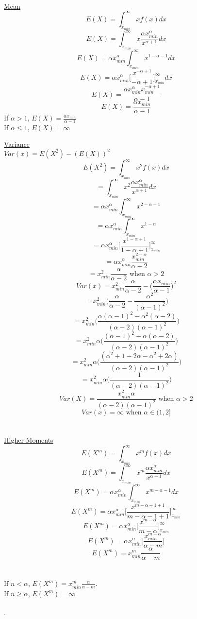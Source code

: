 \documentclass[14pt, a4paper]{article}
\theoremstyle{definition}
\begin{document}
\\ \underline{Mean}
\[ E(X) = \int^\infty _{x_{min}} x f(x) dx\]
\[ E(X) = \int^\infty _{x_{min}} x \frac{\alpha x_{min}^\alpha}{x^{\alpha+1}} dx\]
\[ E(X) = \alpha x_{min}^\alpha \int^\infty _{x_{min}} x^{1 - \alpha - 1} dx\]
\[ E(X) = \alpha x_{min}^\alpha \Big[ \frac{x^{- \alpha +1}}{-\alpha + 1} \Big]^\infty_{x_{min}} dx\]
\[ E(X) =  \frac{\alpha x_{min}^\alpha x_{min}^{-\alpha + 1}}{\alpha - 1} \]
\[ E(X) = \frac{\alpha x_{min}}{\alpha - 1} \]
If $\alpha > 1$, $E(X) = \frac{\alpha x_{min}}{\alpha - 1} $ 
\\ If $\alpha \leq 1$, $E(X) = \infty$

\underline{Variance}
\\ $Var(x) = E(X^2) - (E(X))^2$
\[ E(X^2)  = \int^\infty_{x_{min}} x^2 f(x) dx\]
\[ = \int^\infty_{x_{min}} x^2 \frac{\alpha x_{min}^\alpha}{x^{\alpha+1}} dx\]
\[ = \alpha x_{min}^\alpha \int^\infty_{x_{min}} x^{2-\alpha-1} \]
\[ = \alpha x_{min}^\alpha \int^\infty_{x_{min}} x^{1-\alpha} \]
\[ = \alpha x_{min}^\alpha \Big[ \frac{x^{1-\alpha+1}}{1-\alpha+1} \Big]^\infty_{x_{min}} \]
\[ = \alpha x_{min}^\alpha \frac{x_{min}^{2-\alpha}}{\alpha - 2}  \]
\[ = x_{min}^2 \frac{\alpha}{\alpha-2}  \text{ when } \alpha > 2 \]
\[ Var(x) = x_{min}^2 \frac{\alpha}{\alpha-2} - \Big( \frac{\alpha x_{min}}{\alpha - 1} \Big)^2 \]
\[ = x^2_{min} \Big( \frac{\alpha}{\alpha-2} - \frac{\alpha^2}{(\alpha - 1)^2} \Big) \]
\[ = x^2_{min} \Big( \frac{\alpha(\alpha - 1)^2 - \alpha^2(\alpha-2)}{(\alpha - 2)(\alpha - 1)^2} \Big) \]
\[ = x^2_{min} \alpha \Big( \frac{(\alpha - 1)^2 - \alpha(\alpha-2)}{(\alpha - 2)(\alpha - 1)^2} \Big)\]
\[ = x^2_{min} \alpha \Big( \frac{(\alpha^2 + 1 - 2 \alpha - \alpha^2 + 2 \alpha )}{(\alpha - 2)(\alpha - 1)^2} \Big)\]
\[ = x^2_{min} \alpha \Big( \frac{1}{(\alpha - 2)(\alpha - 1)^2} \Big)\]
\[ Var(X) = \frac{x^2_{min} \alpha }{(\alpha - 2)(\alpha - 1)^2} \text{ when } \alpha > 2\]
\[ Var(x) = \infty \text{ when } \alpha \in (1,2] \]
\\
\\ \underline{Higher Moments}
\[ E (X^m) = \int^\infty_{x_{min}} x^m  f(x) dx\]
\[ E (X^m) = \int^\infty_{x_{min}} x^m \frac{\alpha x_{min}^\alpha}{x^{\alpha+1}} dx\]
\[ E (X^m) = \alpha x_{min}^\alpha \int^\infty_{x_{min}} x^{m - \alpha -1} dx\]
\[ E (X^m) = \alpha x_{min}^\alpha \Big[ \frac{x^{m - \alpha -1+1}}{m - \alpha -1+1} \Big]^\infty_{x_{min}} \]
\[ E (X^m) = \alpha x_{min}^\alpha \Big[ \frac{x^{m - \alpha}}{m - \alpha} \Big]^\infty_{x_{min}} \]
\[ E (X^m) = \alpha x_{min}^\alpha \Big[ \frac{x_{min}^{m - \alpha}}{\alpha - m} \Big] \]
\[ E (X^m) = x_{min}^m \frac{\alpha}{\alpha - m}  \]
\\
\\ If $n< \alpha$, $E (X^m) = x_{min}^m \frac{\alpha}{\alpha - m}$.
\\ If $n \geq \alpha $, $E(X^m) = \infty$
\\
\\ .
\end{document}
